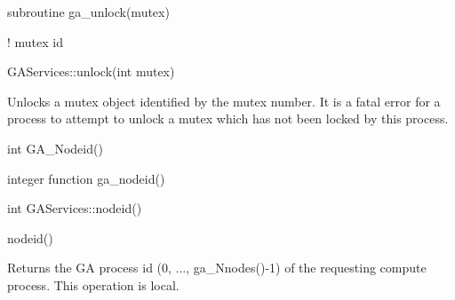 \documentclass[12pt]{article}
\begin{document}
\begin{fapi}
\begin{fcode}
subroutine ga_unlock(mutex)
\end{fcode}
\begin{funcargs}
\end{funcargs}
   ! mutex id
\end{fapi}

\begin{cxxapi}
\begin{cxxcode}
GAServices::unlock(int mutex)
\end{cxxcode}
\begin{funcargs}
\end{funcargs}
\end{cxxapi}

\begin{desc}

Unlocks a mutex object identified by the mutex number. It is a fatal 
error for a process to attempt to unlock a mutex which has not been 
locked by this process.
\end{desc}


\begin{capi}
\begin{ccode}
int GA_Nodeid()
\end{ccode}
\end{capi}

\begin{fapi}
\begin{fcode}
integer function ga_nodeid()
\end{fcode}
\end{fapi}

\begin{cxxapi}
\begin{cxxcode}
int GAServices::nodeid()
\end{cxxcode}
\end{cxxapi}

\begin{pyapi}
\begin{pycode}
nodeid() 
\end{pycode}
\end{pyapi} 


\begin{desc}

Returns the GA process id (0, ..., ga_Nnodes()-1) of the requesting compute process.
This operation is local.
\end{desc}
\end{document}
